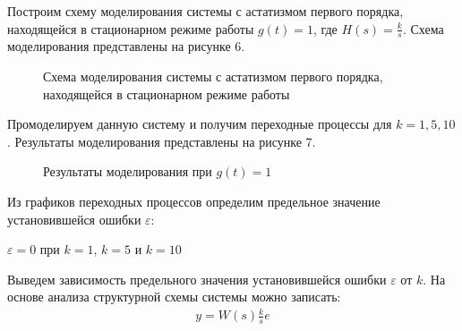 \documentclass[a4paper, 11pt]{article}
\begin{document}
\par 
Построим схему моделирования системы с астатизмом первого порядка, находящейся в стационарном режиме работы $g(t) = 1$, где  $H(s)=\frac{k}{s}$. Схема моделирования представлены на рисунке 6.

\begin{figure}[h!]
\caption{Схема моделирования системы с астатизмом первого порядка, находящейся в стационарном режиме работы}
\label{ris:image}
\end{figure}


\par 
Промоделируем данную систему и получим переходные процессы для $k = 1, 5, 10$. Результаты моделирования представлены на рисунке 7.

\begin{figure}[h!]
\centering
{}
\caption{Результаты моделирования при $g(t)=1$}
\end{figure}

\newpage
\par 
Из графиков переходных процессов определим предельное значение установившейся ошибки $\varepsilon$:
\par 
$\varepsilon = 0$ при $k = 1$, $k = 5$ и $k = 10$
\par 
Выведем зависимость  предельного значения установившейся ошибки $\varepsilon$ от $k$. На основе анализа структурной схемы системы можно записать:
\begin{align}
\displaystyle y=W(s)\frac{k}{s}e
\end{align}
\end{document}
